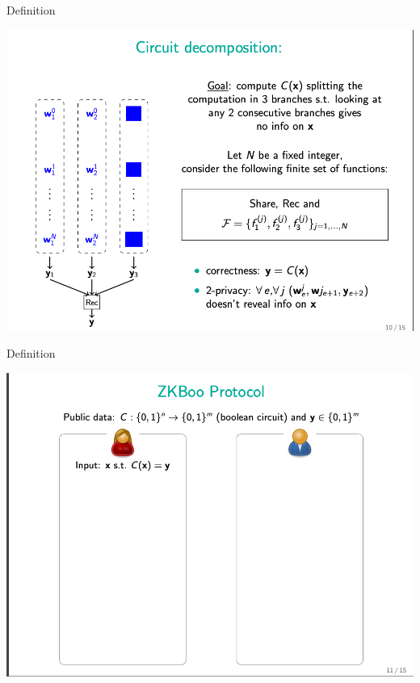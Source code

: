 \documentclass{beamer}
\begin{document}
\begin{frame}{Definition}
	\begin{minipage}{0.42\linewidth}
		\includegraphics[scale=0.4]{f18.png}
	\end{minipage}
\end{frame}


\begin{frame}{Definition}
	\begin{minipage}{0.42\linewidth}
		\includegraphics[scale=0.4]{f19.png}
	\end{minipage}
\end{frame}
\end{document}
